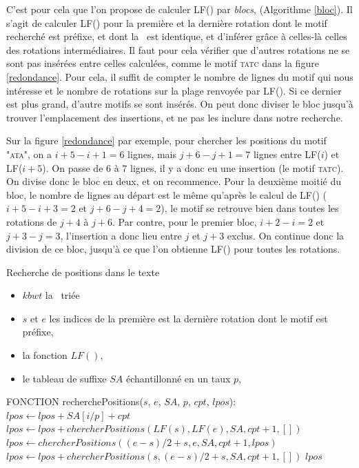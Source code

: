 C'est pour cela que l'on propose de calculer LF() par \textit{blocs}, (Algorithme \ref{bloc}). Il s'agit de calculer LF() pour la première et la dernière rotation dont le motif recherché est préfixe, et dont la \kbwt\ est identique, et d'inférer grâce à celles-là celles des rotations intermédiaires. Il faut pour cela vérifier que d'autres rotations ne se sont pas insérées entre celles calculées, comme le motif \textsc{tatc} dans la figure \ref{redondance}. Pour cela, il suffit de compter le nombre de lignes du motif qui nous intéresse et le nombre de rotations sur la plage renvoyée par LF(). Si ce dernier est plus grand, d'autre motifs se sont insérés. On peut donc diviser le bloc jusqu'à trouver l'emplacement des insertions, et ne pas les inclure dans notre recherche.

Sur la figure \ref{redondance} par exemple, pour chercher les positions du motif \textsc{"ata"}, on a $i+5 - i +1 = 6$ lignes, mais $j+6 - j +1 = 7$ lignes entre LF($i$) et LF($i+5$). On passe de 6 à 7 lignes, il y a donc eu une insertion (le motif \textsc{tatc}). On divise donc le bloc en deux, et on recommence. Pour la deuxième moitié du bloc, le nombre de lignes au départ est le même qu'après le calcul de LF() ($i+5 - i+3 = 2$ et $j+6 - j+4 = 2$), le motif se retrouve bien dans toutes les rotations de $j+4$ à $j+6$. Par contre, pour le premier bloc, $i+2 - i = 2$ et $j+3 - j = 3$, l'insertion a donc lieu entre $j$ et $j+3$ exclus. On continue donc la division de ce bloc, jusqu'à ce que l'on obtienne LF() pour toutes les rotations.


\begin{algorithm}
\caption{Recherche de positions dans le texte}	
\label{bloc}	
	\begin{algorithmic}
	\REQUIRE 
		\begin{itemize}
			\item $kbwt$ la \kbwt\ triée
			\item $s$ et $e$ les indices de la première est la dernière rotation dont le motif est préfixe, 
			\item la fonction $LF()$, 
			\item le tableau de suffixe $SA$ échantillonné en un taux $p$, 
		\end{itemize}
	\STATE FONCTION recherchePositions($s$, $e$, $SA$, $p$, $cpt$, $lpos$): \\
		\STATE $lpos \gets lpos + SA[i/p] + cpt$
	\ENDFOR
		\STATE $lpos \gets lpos + chercherPositions(LF(s), LF(e), SA, cpt+1, [])$
	\ELSE
		\STATE $lpos \gets chercherPositions((e-s)/2 +s, e, SA, cpt+1, lpos)$
		\STATE $lpos \gets lpos + chercherPositions(s, (e-s)/2 +s, SA, cpt+1, [])$
	\ENDIF
	\RETURN $lpos$
	\end{algorithmic}
\end{algorithm}



